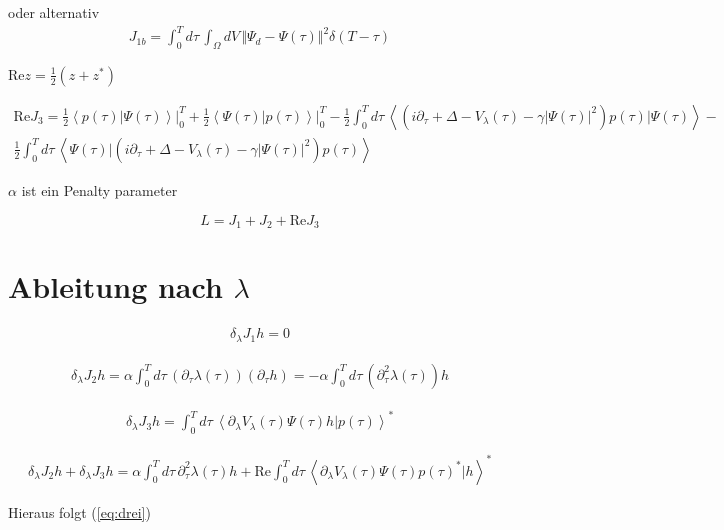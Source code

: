 \documentclass[10pt,a4paper]{article}
\newcommand{\iu}{\ensuremath{i}}
\newcommand{\intT}{\ensuremath{\int_0^T d\tau\,}}
\newcommand{\intV}{\ensuremath{\int_{\Omega} dV\,}}
\newcommand{\skalarprodukt}[2]{\left< #1 \vert #2 \right>}
\begin{document}
oder alternativ 
\begin{align}
J_{1b} = \intT \intV \Vert \Psi_d - \Psi(\tau) \Vert^2 \delta(T-\tau)
\end{align}

$\text{Re} z = \frac{1}{2} ( z + z^* )$

\begin{multline}
\text{Re} J_3 = \frac{1}{2} \skalarprodukt{p(\tau)}{\Psi(\tau)} \vert_0^T + \frac{1}{2} \skalarprodukt{\Psi(\tau)}{p(\tau)} \vert_0^T - \frac{1}{2} \intT \skalarprodukt{\left(\iu \partial_{\tau} + \Delta - V_{\lambda}(\tau) - \gamma \vert \Psi(\tau) \vert^2 \right) p(\tau)}{\Psi(\tau)} - \\ \frac{1}{2} \intT \skalarprodukt{\Psi(\tau)}{\left(\iu \partial_{\tau} + \Delta - V_{\lambda}(\tau) - \gamma \vert \Psi(\tau) \vert^2 \right) p(\tau)}
\end{multline}

$\alpha$ ist ein Penalty parameter

\begin{equation}
L = J_1 + J_2 + \text{Re} J_3 
\end{equation}


\section{Ableitung nach $\lambda$}

\begin{align}
\delta_{\lambda} J_1 h = 0
\end{align}

\begin{align}
\delta_{\lambda} J_2 h = \alpha \intT \left( \partial_{\tau} \lambda(\tau) \right) \left( \partial_{\tau} h \right) = -\alpha \intT \left( \partial_{\tau}^2 \lambda(\tau) \right) h
\end{align}

\begin{align}
\delta_{\lambda} J_3 h = \intT \skalarprodukt{\partial_{\lambda} V_{\lambda}(\tau) \Psi(\tau) h}{p(\tau)}^*
\end{align}

\begin{align}
\delta_{\lambda} J_2 h  + \delta_{\lambda} J_3 h = \alpha \intT \partial_{\tau}^2 \lambda(\tau) h  + \text{Re} \intT \skalarprodukt{\partial_{\lambda} V_{\lambda}(\tau) \Psi(\tau) p(\tau)^* }{h}^*
\end{align}

Hieraus folgt (\ref{eq:drei})
\end{document}

